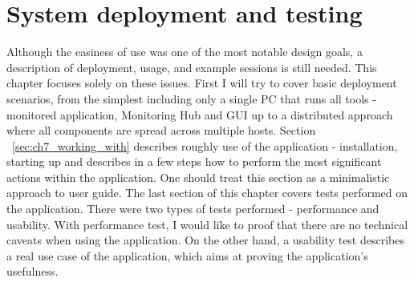  
%


\chapter{System deployment and testing}
\label{cha:deployment}

\parbox{0.8\textwidth}{

{\small
Although the easiness of use was one of the most notable design goals, a description of deployment, usage, and example sessions is still needed. This chapter focuses solely on these issues. First I will try to cover basic deployment scenarios, from the simplest including only a single PC that runs all tools - monitored application, Monitoring Hub and GUI up to a distributed approach where all components are spread across multiple hosts. Section ~\ref{sec:ch7_working_with} describes roughly use of the application - installation, starting up and describes in a few steps how to perform the most significant actions within the application. One should treat this section as a minimalistic approach to user guide. The last section of this chapter covers tests performed on the application. There were two types of tests performed - performance and usability. With performance test, I would like to proof that there are no technical caveats when using the application. On the other hand, a usability test describes a real use case of the application, which aims at proving the application\rq{}s usefulness.
}
}









